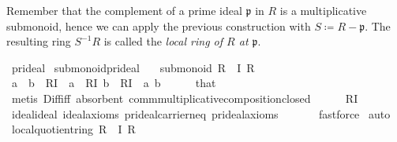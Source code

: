 \documentclass[12pt]{scrartcl}
\begin{document}
Remember that the complement of a prime ideal $\mathfrak{p}$ in $R$ is a multiplicative submonoid, hence we can apply the previous construction with $S \coloneqq R - \mathfrak{p}$. The resulting ring  $S^{-1} R$ is called the \emph{local ring of $R$ at $\mathfrak{p}$}. \\

\begin{isabelle}
\isamarkupfalse%
\ pr{\isacharunderscore}{\kern0pt}ideal\isanewline
{}\isanewline
\isanewline
{}\isamarkupfalse%
\ submonoid{\isacharunderscore}{\kern0pt}pr{\isacharunderscore}{\kern0pt}ideal{\isacharcolon}{\kern0pt}\isanewline
\ \ \ {\isachardoublequoteopen}submonoid\ {\isacharparenleft}{\kern0pt}R\ {\isasymsetminus}\ I{\isacharparenright}{\kern0pt}\ R\ {\isacharparenleft}{\kern0pt}{\isasymcdot}{\isacharparenright}{\kern0pt}\ {\isasymone}{\isachardoublequoteclose}\isanewline
{}\isamarkupfalse%
\isanewline
\ \ \isamarkupfalse%
\ {\isachardoublequoteopen}a\ {\isasymcdot}\ b\ {\isasymin}\ R{\isasymsetminus}I{\isachardoublequoteclose}\ \ {\isachardoublequoteopen}a\ {\isasymin}\ R{\isasymsetminus}I{\isachardoublequoteclose}\ {\isachardoublequoteopen}b\ {\isasymin}\ R{\isasymsetminus}I{\isachardoublequoteclose}\ \ a\ b\isanewline
\ \ \ \ \isamarkupfalse%
\ that\ \isamarkupfalse%
\ {\isacharparenleft}{\kern0pt}metis\ Diff{\isacharunderscore}{\kern0pt}iff\ absorbent\ comm{\isachardot}{\kern0pt}multiplicative{\isachardot}{\kern0pt}composition{\isacharunderscore}{\kern0pt}closed{\isacharparenright}{\kern0pt}\isanewline
\ \ \isamarkupfalse%
\ {\isachardoublequoteopen}{\isasymone}\ {\isasymin}\ R{\isasymsetminus}I{\isachardoublequoteclose}\isanewline
\ \ \ \ \isamarkupfalse%
\ ideal{\isachardot}{\kern0pt}ideal{\isacharparenleft}{\kern0pt}{}{\isacharparenright}{\kern0pt}\ ideal{\isacharunderscore}{\kern0pt}axioms\ pr{\isacharunderscore}{\kern0pt}ideal{\isachardot}{\kern0pt}carrier{\isacharunderscore}{\kern0pt}neq\ pr{\isacharunderscore}{\kern0pt}ideal{\isacharunderscore}{\kern0pt}axioms\ \isanewline
\ \ \ \ \isamarkupfalse%
\ fastforce\isanewline
{}\isamarkupfalse%
\ auto%
\isanewline
\isanewline
{}\isamarkupfalse%
\ local{\isacharcolon}{\kern0pt}quotient{\isacharunderscore}{\kern0pt}ring\ {\isachardoublequoteopen}{\isacharparenleft}{\kern0pt}R\ {\isasymsetminus}\ I{\isacharparenright}{\kern0pt}{\isachardoublequoteclose}\ R\ {\isachardoublequoteopen}{\isacharparenleft}{\kern0pt}{\isacharplus}{\kern0pt}{\isacharparenright}{\kern0pt}{\isachardoublequoteclose}\ {\isachardoublequoteopen}{\isacharparenleft}{\kern0pt}{\isasymcdot}{\isacharparenright}{\kern0pt}{\isachardoublequoteclose}\ {\isasymzero}\ {\isasymone}\isanewline

\end{isabelle}
\end{document}
